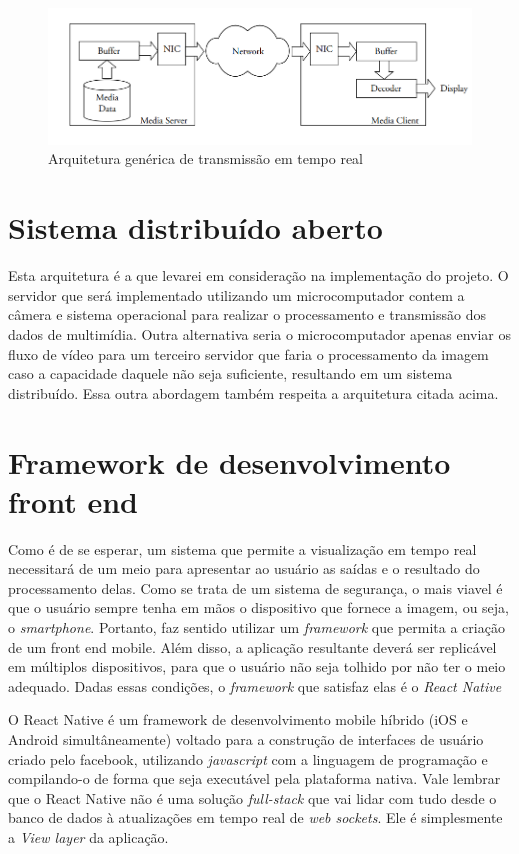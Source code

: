 \documentclass[12pt, %
openright, 
oneside, %
a4paper,    %
brazil]{facom-ufu-abntex2}
\begin{document}
\begin{figure}[!ht]
	\centering
	\includegraphics[width=1\linewidth]{Capturar.PNG}
	\caption[Representação de um arquitetura de tempo real genérica]{Arquitetura genérica de transmissão em tempo real}
	\label{fig:graficosVariandoTamanhoRede}
\end{figure}

\section{Sistema distribuído aberto}

Esta arquitetura é a que levarei em consideração na implementação do projeto. O
servidor que será implementado utilizando um microcomputador contem a câmera e
sistema operacional para realizar o processamento e transmissão dos dados de
multimídia. Outra alternativa seria o microcomputador apenas enviar os fluxo de
vídeo para um terceiro servidor que faria o processamento da imagem caso a
capacidade daquele não seja suficiente, resultando em um sistema distribuído.
Essa outra abordagem também respeita a arquitetura citada acima.

\section{Framework de desenvolvimento front end}

Como é de se esperar, um sistema que permite a visualização em tempo real
necessitará de um meio para apresentar ao usuário as saídas e o resultado do
processamento delas. Como se trata de um sistema de segurança, o mais viavel é
que o usuário sempre tenha em mãos o dispositivo que fornece a imagem, ou seja,
o \emph{smartphone}. Portanto, faz sentido utilizar um \emph{framework} que
permita a criação de um front end mobile. Além disso, a aplicação resultante
deverá ser replicável em múltiplos dispositivos, para que o usuário não seja
tolhido por não ter o meio adequado. Dadas essas condições, o \emph{framework}
que satisfaz elas é o \emph{React Native}

O React Native é um framework de desenvolvimento mobile híbrido (iOS e Android
simultâneamente) voltado para a construção de interfaces de usuário criado pelo
facebook, utilizando \emph{javascript} com a linguagem de programação e
compilando-o de forma que seja executável pela plataforma nativa. Vale lembrar
que o React Native não é uma solução \emph{full-stack} que vai lidar com tudo
desde o banco de dados à atualizações em tempo real de \emph{web sockets}. Ele
é simplesmente a \emph{View layer} da aplicação. \cite{boduch2017react}
\end{document}
